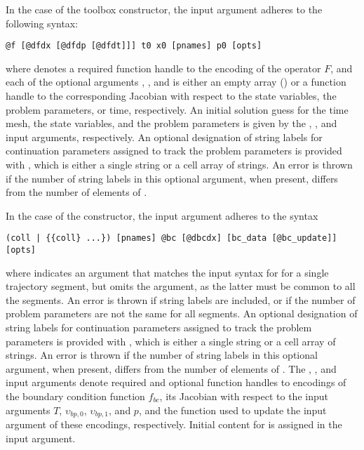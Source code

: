 In the case of the  toolbox constructor, the  input argument adheres to the following syntax:
\begin{lstlisting}[language=coco-highlight]
@f [@dfdx [@dfdp [@dfdt]]] t0 x0 [pnames] p0 [opts]
\end{lstlisting}
where  denotes a required function handle to the encoding of the operator $F$, and each of the optional arguments , , and  is either an empty array (\mcode{[]}) or a function handle to the corresponding Jacobian with respect to the state variables, the problem parameters, or time, respectively. An initial solution guess for the time mesh, the state variables, and the problem parameters is given by the , , and  input arguments, respectively. An optional designation of string labels for continuation parameters assigned to track the problem parameters is provided with , which is either a single string or a cell array of strings. An error is thrown if the number of string labels in this optional argument, when present, differs from the number of elements of .

In the case of the  constructor, the  input argument adheres to the syntax
\begin{lstlisting}[language=coco-highlight]
(coll | {{coll} ...}) [pnames] @bc [@dbcdx] [bc_data [@bc_update]] [opts]
\end{lstlisting}
where  indicates an argument that matches the  input syntax for  for a single trajectory segment, but omits the  argument, as the latter must be common to all the segments.  An error is thrown if string labels are included, or if the number of problem parameters are not the same for all segments. An optional designation of string labels for continuation parameters assigned to track the problem parameters is provided with , which is either a single string or a cell array of strings. An error is thrown if the number of string labels in this optional argument, when present, differs from the number of elements of . The , , and  input arguments denote required and optional function handles to encodings of the boundary condition function $f_{bc}$, its Jacobian with respect to the input arguments $T$, $\upsilon_{bp,0}$, $\upsilon_{bp,1}$, and $p$, and the function used to update the  input argument of these encodings, respectively. Initial content for  is assigned in the  input argument.

